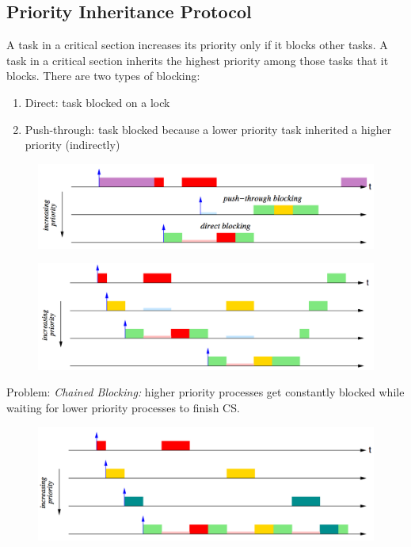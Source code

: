 \documentclass{hw}
\begin{document}
\subsection{Priority Inheritance Protocol}
A task in a critical section increases its priority only if it blocks other 
tasks. A task in a critical section inherits the highest priority among those 
tasks that it blocks. There are two types of blocking:
\begin{enumerate}
  \item Direct: task blocked on a lock
  \item Push-through: task blocked because a lower priority task inherited a 
    higher priority (indirectly)
\end{enumerate}
\begin{figure}[H]
  \centering
  \includegraphics[scale=.6]{pip1}
\end{figure}
\begin{figure}[H]
  \centering
  \includegraphics[scale=.6]{pip2}
\end{figure}
Problem: \emph{Chained Blocking:} higher priority processes get constantly 
blocked while waiting for lower priority processes to finish CS.
\begin{figure}[H]
  \centering
  \includegraphics[scale=.6]{pip3}
\end{figure}
\end{document}
